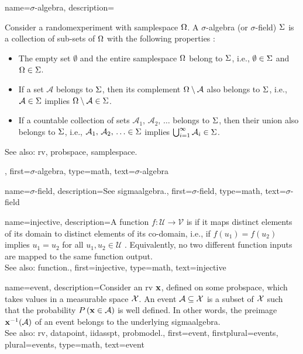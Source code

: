 {name={$\sigma$-algebra}, 
	description={Consider a \gls{randomexperiment} with \gls{samplespace} $\Omega$. 
		A $\sigma$-algebra (or $\sigma$-field) $\Sigma$ 
		is a collection of sub-sets of $\Omega$ with the following properties 
		\cite{RudinBook,BillingsleyProbMeasure,durrett2010probability}:
		 \begin{itemize}
		 	\item The empty set $\emptyset$ and the entire \gls{samplespace} 
		 	$\Omega$ belong to $\Sigma$, i.e., $\emptyset \in \Sigma$ and $\Omega \in \Sigma$.
		 	\item If a set $\mathcal{A}$ belongs to $\Sigma$, then its complement 
		 	$\Omega \setminus \mathcal{A}$ also belongs to $\Sigma$, i.e., 
		 	$\mathcal{A} \in \Sigma$ implies $\Omega \setminus \mathcal{A} \in \Sigma$.
		 	\item If a countable collection of sets $\mathcal{A}_1, \,\mathcal{A}_2, \,\ldots$ belongs 
			to $\Sigma$, 
		 	then their union also belongs to $\Sigma$, i.e.,
		 	$\mathcal{A}_1, \,\mathcal{A}_2, \,\ldots \in \Sigma$ implies 
		 	$\bigcup_{i=1}^{\infty} \mathcal{A}_i \in \Sigma$.	
		 \end{itemize}			 
		See also: \gls{rv}, \gls{probspace}, \gls{samplespace}.},
	first={$\sigma$-algebra},
	type=math, 
	text={$\sigma$-algebra} 
}

{name={$\sigma$-field}, 
	description={See \gls{sigmaalgebra}.}, 
	first={$\sigma$-field},
	type=math,
	text={$\sigma$-field} 
}


{name={injective}, 
	description={A \gls{function} $f: \mathcal{U} \rightarrow \mathcal{V}$ is 
	if it maps distinct elements of its \gls{domain} to distinct elements 
	of its \gls{co-domain}, 
    i.e., if $f(u_1) = f(u_2)$ implies $u_1 = u_2$ for all $u_1, u_2 \in \mathcal{U}$ 
        \cite{HalmosSet}. 
    Equivalently, no two different \gls{function} inputs are mapped to the same \gls{function} output.
				\\
		See also: \gls{function}.},
	first={injective},
	type=math,
	text={injective} 
}


{name={event}, 
	description={Consider an \gls{rv} ${\bf x}$, defined on some \gls{probspace}, 
		which takes values in a \gls{measurable} space $\mathcal{X}$. An 
		event $\mathcal{A} \subseteq \mathcal{X}$ is a subset of $\mathcal{X}$ 
		such that the \gls{probability} $P\left({\bf x} \in \mathcal{A}\right)$ is well 
		defined. In other words, the \gls{preimage} ${\bf x}^{-1}(\mathcal{A})$ 
		of an event belongs to the underlying \gls{sigmaalgebra}. 
				\\
		See also: \gls{rv}, \gls{datapoint}, \gls{iidasspt}, \gls{probmodel}.},
	first={event},
	firstplural={events},
	plural={events},
	type=math,
	text={event} 
}

